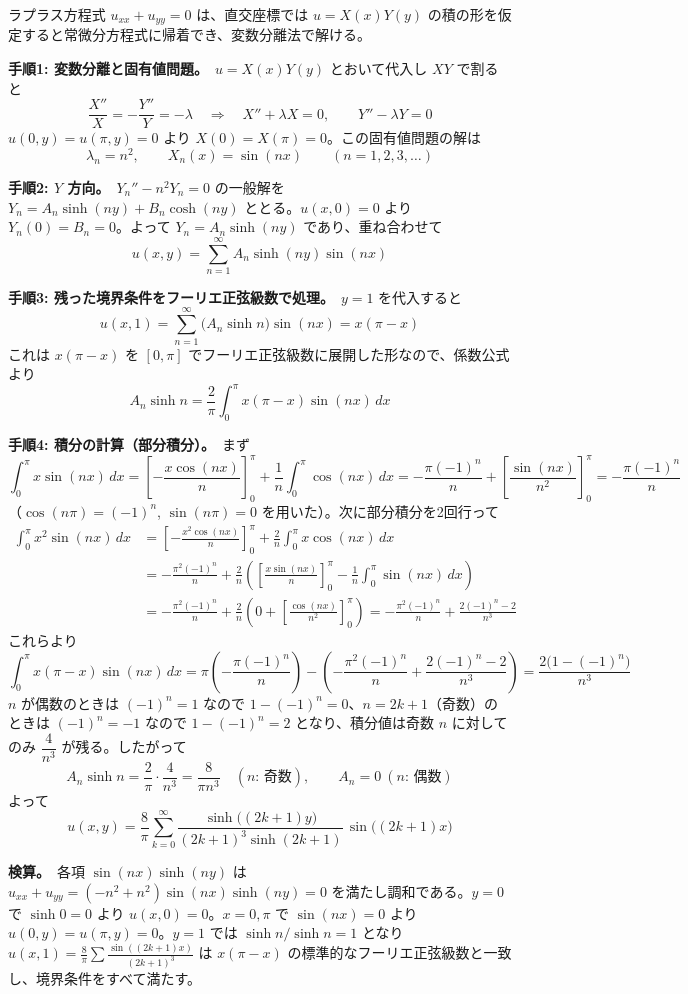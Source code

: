 
ラプラス方程式 $u_{xx} + u_{yy} = 0$ は、直交座標では $u = X(x)Y(y)$ の積の形を仮定すると常微分方程式に帰着でき、変数分離法で解ける。

\textbf{手順1: 変数分離と固有値問題。}\ $u = X(x)Y(y)$ とおいて代入し $XY$ で割ると
\[
\frac{X''}{X} = -\frac{Y''}{Y} = -\lambda
\quad\Longrightarrow\quad
X'' + \lambda X = 0, \qquad Y'' - \lambda Y = 0
\]
$u(0,y) = u(\pi,y) = 0$ より $X(0) = X(\pi) = 0$。この固有値問題の解は
\[
\lambda_n = n^2, \qquad X_n(x) = \sin(nx) \qquad (n = 1, 2, 3, \dots)
\]

\textbf{手順2: $Y$ 方向。}\ $Y_n'' - n^2 Y_n = 0$ の一般解を $Y_n = A_n\sinh(ny) + B_n\cosh(ny)$ ととる。$u(x,0) = 0$ より $Y_n(0) = B_n = 0$。よって $Y_n = A_n\sinh(ny)$ であり、重ね合わせて
\[
u(x,y) = \sum_{n=1}^{\infty} A_n \sinh(ny)\sin(nx)
\]

\textbf{手順3: 残った境界条件をフーリエ正弦級数で処理。}\ $y=1$ を代入すると
\[
u(x,1) = \sum_{n=1}^{\infty} \bigl(A_n \sinh n\bigr)\sin(nx) = x(\pi - x)
\]
これは $x(\pi-x)$ を $[0,\pi]$ でフーリエ正弦級数に展開した形なので、係数公式より
\[
A_n \sinh n = \frac{2}{\pi}\int_0^{\pi} x(\pi - x)\sin(nx)\,dx
\]

\textbf{手順4: 積分の計算（部分積分）。}\ まず
\[
\int_0^\pi x\sin(nx)\,dx
= \left[-\frac{x\cos(nx)}{n}\right]_0^\pi + \frac{1}{n}\int_0^\pi \cos(nx)\,dx
= -\frac{\pi(-1)^n}{n} + \left[\frac{\sin(nx)}{n^2}\right]_0^\pi
= -\frac{\pi(-1)^n}{n}
\]
（$\cos(n\pi) = (-1)^n$, $\sin(n\pi) = 0$ を用いた）。次に部分積分を2回行って
\begin{align*}
\int_0^\pi x^2\sin(nx)\,dx
&= \left[-\frac{x^2\cos(nx)}{n}\right]_0^\pi + \frac{2}{n}\int_0^\pi x\cos(nx)\,dx \\
&= -\frac{\pi^2(-1)^n}{n} + \frac{2}{n}\left(\left[\frac{x\sin(nx)}{n}\right]_0^\pi - \frac{1}{n}\int_0^\pi \sin(nx)\,dx\right) \\
&= -\frac{\pi^2(-1)^n}{n} + \frac{2}{n}\left(0 + \left[\frac{\cos(nx)}{n^2}\right]_0^\pi\right)
= -\frac{\pi^2(-1)^n}{n} + \frac{2(-1)^n - 2}{n^3}
\end{align*}
これらより
\[
\int_0^\pi x(\pi-x)\sin(nx)\,dx
= \pi\left(-\frac{\pi(-1)^n}{n}\right) - \left(-\frac{\pi^2(-1)^n}{n} + \frac{2(-1)^n-2}{n^3}\right)
= \frac{2\bigl(1-(-1)^n\bigr)}{n^3}
\]
$n$ が偶数のときは $(-1)^n = 1$ なので $1 - (-1)^n = 0$、$n = 2k+1$（奇数）のときは $(-1)^n = -1$ なので $1 - (-1)^n = 2$ となり、積分値は奇数 $n$ に対してのみ $\dfrac{4}{n^3}$ が残る。したがって
\[
A_n \sinh n = \frac{2}{\pi}\cdot\frac{4}{n^3} = \frac{8}{\pi n^3} \quad (n\text{: 奇数}), \qquad A_n = 0\ (n\text{: 偶数})
\]
よって
\[
\boxed{\;
u(x,y) = \frac{8}{\pi}\sum_{k=0}^{\infty} \frac{\sinh\bigl((2k+1)y\bigr)}{(2k+1)^{3}\sinh(2k+1)}\,\sin\bigl((2k+1)x\bigr)
\;}
\]

\textbf{検算。}\ 各項 $\sin(nx)\sinh(ny)$ は $u_{xx}+u_{yy} = (-n^2+n^2)\sin(nx)\sinh(ny) = 0$ を満たし調和である。$y=0$ で $\sinh 0=0$ より $u(x,0)=0$。$x=0,\pi$ で $\sin(nx)=0$ より $u(0,y)=u(\pi,y)=0$。$y=1$ では $\sinh n/\sinh n = 1$ となり $u(x,1) = \frac{8}{\pi}\sum \frac{\sin((2k+1)x)}{(2k+1)^3}$ は $x(\pi-x)$ の標準的なフーリエ正弦級数と一致し、境界条件をすべて満たす。
